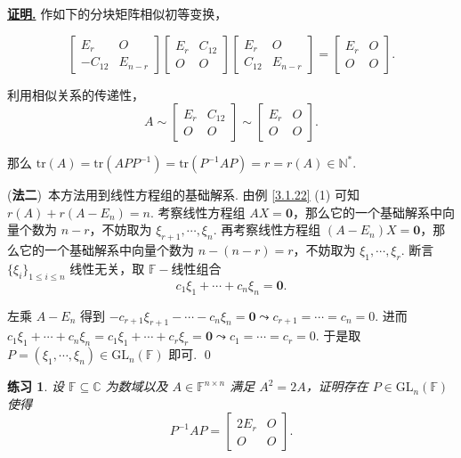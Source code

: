 \documentclass[10pt,openany]{article}
\theoremstyle{thmstyle} %
\newtheorem{practice}{练习}[section]
\theoremstyle{defstyle} %
\theoremstyle{prostyle} %
\theoremstyle{exastyle}
\theoremstyle{remstyle}
\renewenvironment{proof}[1][证明]{\par\underline{\textbf{#1.}} \;\fangsong}{\qed\par}
\newcommand{\F}{\mathbb{F}}
\newcommand{\gfn}{\text{GL}_n(\mathbb{F})}
\newcommand{\C}{\mathbb{C}}
\newcommand{\n}{^{n \times n}}
\newcommand{\tr}{\mathrm{tr}}
\begin{document}
\begin{proof}
     作如下的分块矩阵相似初等变换，
   
     \[ \begin{bmatrix}
     	E_r & O \\
     	-C_{12} & E_{n-r}
     \end{bmatrix}\begin{bmatrix}
     E_r & C_{12} \\
     O & O
     \end{bmatrix}\begin{bmatrix}
     E_r & O \\
     C_{12} & E_{n-r}
     \end{bmatrix}=\begin{bmatrix}
     E_r & O \\
     O & O
     \end{bmatrix}. \]
     
     利用相似关系的传递性，
     \[ A \sim \begin{bmatrix}
     	E_r & C_{12} \\
     	O & O
     \end{bmatrix} \sim \begin{bmatrix}
     E_r & O \\
     O & O
     \end{bmatrix}. \]
    
    那么 \( \tr(A)=\tr(APP^{-1})=\tr(P^{-1}AP)=r=r(A) \in \mathbb{N}^* \).
    
    (\textbf{法二})\ 本方法用到线性方程组的基础解系. 由例 \ref{3.1.22} (1) 可知 \( r(A)+r(A-E_n)=n \). 考察线性方程组 \( AX=\bm{0} \)，那么它的一个基础解系中向量个数为 \( n-r \)，不妨取为 \( \xi_{r+1},\cdots,\xi_{n} \). 再考察线性方程组 \( (A-E_n)X=\bm{0} \)，那么它的一个基础解系中向量个数为 \( n-(n-r)=r \)，不妨取为 \(\xi_1,\cdots,\xi_r \). 断言 \( \{\xi_i\}_{1 \leq i \leq n} \) 线性无关，取 \( \F-\)线性组合
    \[ c_1\xi_1+\cdots+c_n\xi_n=\bm{0}. \]
    
    左乘 \( A-E_n \) 得到 \( -c_{r+1}\xi_{r+1}-\cdots-c_n\xi_n=\bm{0} \leadsto c_{r+1}=\cdots=c_n=0 \). 进而 \( c_1\xi_1+\cdots+c_n\xi_n=c_1\xi_1+\cdots+c_r\xi_r=\bm{0} \leadsto c_1=\cdots=c_r=0 \). 于是取 \( P=(\xi_1,\cdots,\xi_n) \in \gfn \) 即可.
\end{proof}


\begin{practice} \label{prac3.17}
    设 \( \F \subseteq \C \) 为数域以及 \( A \in \F\n \) 满足 \( A^2=2A \)，证明存在 \( P \in \gfn \) 使得
     \[ P^{-1}AP=\begin{bmatrix}
	2E_r & O \\
	O & O
    \end{bmatrix}. \]
\end{practice}
\end{document}
